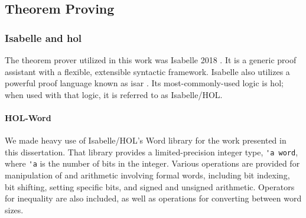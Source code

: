 %
%
%

\subsection{Theorem Proving}


\subsubsection{Isabelle and \acs*{hol}}
The theorem prover utilized in this work
was Isabelle 2018 \autocite{nipkow2002isabelle}.%
It is a generic proof assistant with a flexible, extensible syntactic framework.
Isabelle also utilizes a powerful proof language
known as \ac{isar} \autocite{wenzel2007isabelle}.
Its most-commonly-used logic is \ac{hol}; when used with that logic,
it is referred to as Isabelle/HOL.

\paragraph{HOL-Word}
We made heavy use of Isabelle/HOL's Word library \autocite{isabelle-word-session}
for the work presented in this dissertation.
That library provides a limited-precision integer type, \lstinline|'a word|,
where \lstinline|'a| is the number of bits in the integer.
Various operations are provided for manipulation of and arithmetic
involving formal words, including bit indexing, bit shifting, setting specific bits,
and signed and unsigned arithmetic.
Operators for inequality are also included,
as well as operations for converting between word sizes.


